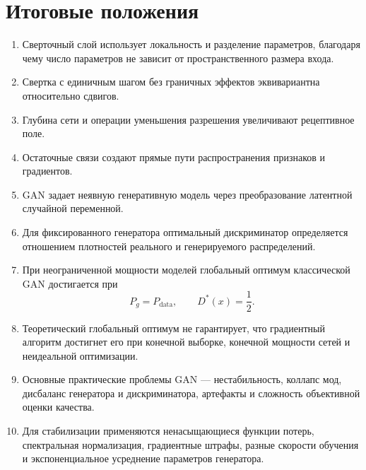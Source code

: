 \documentclass[12pt,a4paper]{article}
\numberwithin{equation}{section}
\theoremstyle{definition}
\theoremstyle{remark}
\begin{document}
\section{Итоговые положения}

\begin{enumerate}
    \item Сверточный слой использует локальность и разделение
    параметров, благодаря чему число параметров не зависит от
    пространственного размера входа.

    \item Свертка с единичным шагом без граничных эффектов
    эквивариантна относительно сдвигов.

    \item Глубина сети и операции уменьшения разрешения увеличивают
    рецептивное поле.

    \item Остаточные связи создают прямые пути распространения
    признаков и градиентов.

    \item GAN задает неявную генеративную модель через преобразование
    латентной случайной переменной.

    \item Для фиксированного генератора оптимальный дискриминатор
    определяется отношением плотностей реального и генерируемого
    распределений.

    \item При неограниченной мощности моделей глобальный оптимум
    классической GAN достигается при
    \[
        P_g=P_{\mathrm{data}},
        \qquad
        D^*(x)=\frac{1}{2}.
    \]

    \item Теоретический глобальный оптимум не гарантирует, что
    градиентный алгоритм достигнет его при конечной выборке, конечной
    мощности сетей и неидеальной оптимизации.

    \item Основные практические проблемы GAN --- нестабильность,
    коллапс мод, дисбаланс генератора и дискриминатора, артефакты и
    сложность объективной оценки качества.

    \item Для стабилизации применяются ненасыщающиеся функции потерь,
    спектральная нормализация, градиентные штрафы, разные скорости
    обучения и экспоненциальное усреднение параметров генератора.
\end{enumerate}
\end{document}
